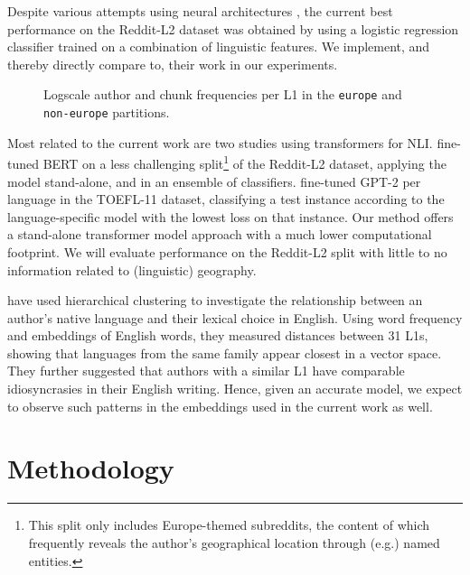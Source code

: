 \documentclass[10pt, a4paper]{article}
\begin{document}
Despite various attempts using neural architectures \cite{ircing-2017-shared-task2-NN,bjerva-etal-2017-convolutional,franco-salvador-etal-2017-bridging}, the current best performance on the Reddit-L2 dataset was obtained by  using a logistic regression classifier trained on a combination of linguistic features. We implement, and thereby directly compare to, their work in our experiments.

\begin{figure*}[t]
    \centering
    \centering
    
    \caption{Logscale author and chunk frequencies per L1 in the \texttt{europe} and \texttt{non-europe} partitions.}
    \label{fig:stacked_data}
\end{figure*}


Most related to the current work are two studies using transformers for NLI.   fine-tuned BERT \cite{DBLP:conf/naacl/DevlinCLT19} on a less challenging split\footnote{This split only includes Europe-themed subreddits, the content of which frequently reveals the author's geographical location through (e.g.) named entities.} of the Reddit-L2 dataset, applying the model stand-alone, and in an ensemble of classifiers.  fine-tuned GPT-2 \cite{Radford2019LanguageMA} per language in the TOEFL-11 dataset, classifying a test instance according to the language-specific model with the lowest loss on that instance. Our method offers a stand-alone transformer model approach with a much lower computational footprint. We will evaluate performance on the Reddit-L2 split with little to no information related to (linguistic) geography.

 have used hierarchical clustering to investigate the relationship between an author's native language and their lexical choice in English. Using word frequency and embeddings of English words, they measured distances between 31 L1s, showing that languages from the same family appear closest in a vector space. They further suggested that authors with a similar L1 have comparable idiosyncrasies in their English writing. Hence, given an accurate model, we expect to observe such patterns in the embeddings used in the current work as well.


\section{Methodology}
\end{document}
